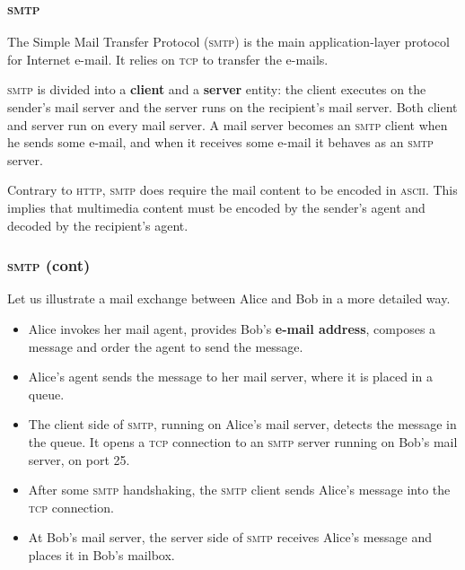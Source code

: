 %
\begin{frame}
\frametitle{\textsc{smtp}}

The Simple Mail Transfer Protocol (\textsc{smtp}) is the main
application-layer protocol for Internet e-mail. It relies on
\textsc{tcp} to transfer the e-mails.

\textsc{smtp} is divided into a \textbf{client} and a \textbf{server}
entity: the client executes on the sender's mail server and the server
runs on the recipient's mail server. Both client and server run on
every mail server. A mail server becomes an \textsc{smtp} client when
he sends some e-mail, and when it receives some e-mail it behaves as
an \textsc{smtp} server.

Contrary to \textsc{http}, \textsc{smtp} does require the mail content
to be encoded in \textsc{ascii}. This implies that multimedia content
must be encoded by the sender's agent and decoded by the recipient's
agent.

\end{frame}

%
\begin{frame}
\frametitle{\textsc{smtp} (cont)}

Let us illustrate a mail exchange between Alice and Bob in a more
detailed way.

\begin{itemize}

  \item Alice invokes her mail agent, provides Bob's \textbf{e-mail
    address}, composes a message and order the agent to send the
    message.

  \item Alice's agent sends the message to her mail server, where it
    is placed in a queue.

  \item The client side of \textsc{smtp}, running on Alice's mail
    server, detects the message in the queue. It opens a \textsc{tcp}
    connection to an \textsc{smtp} server running on Bob's mail
    server, on port 25.

  \item After some \textsc{smtp} handshaking, the \textsc{smtp} client
    sends Alice's message into the \textsc{tcp} connection.

  \item At Bob's mail server, the server side of \textsc{smtp}
    receives Alice's message and places it in Bob's mailbox.

\end{itemize}

\end{frame}

